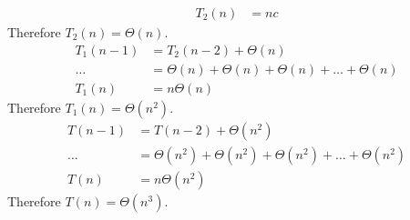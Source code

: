 \documentclass[paper=a4, fontsize=11pt]{scrartcl} %
\numberwithin{equation}{section} %
\numberwithin{figure}{section} %
\numberwithin{table}{section} %
\begin{document}
\begin{enumerate}[label=\bfseries Algorithm \arabic*:]
\begin{description}
\begin{align*}
            T_2(n) & = nc
        \end{align*}
        Therefore $T_2(n) = \Theta(n)$.
        \begin{align*}
            T_1(n - 1) & = T_2(n - 2) + \Theta(n) \\
            \ldots & = \Theta(n) + \Theta(n) + \Theta(n) + \ldots + \Theta(n) \\
            T_1(n) & = n\Theta(n)
        \end{align*}
        Therefore $T_1(n) = \Theta(n^2)$.
        \begin{align*}
            T(n - 1) & = T(n - 2) + \Theta(n^2) \\
            \ldots & = \Theta(n^2) + \Theta(n^2) + \Theta(n^2) + \ldots + \Theta(n^2) \\
            T(n) & = n\Theta(n^2)
        \end{align*}
        Therefore $T(n) = \Theta(n^3)$.
    \end{description}


\end{enumerate}
\end{document}
